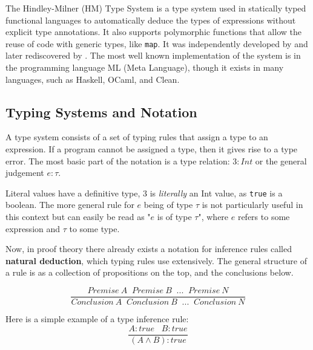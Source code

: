 \documentclass{l4proj}
\begin{document}
The Hindley-Milner (HM) Type System is a type system used in statically typed functional languages to automatically deduce the types of expressions without explicit type annotations.
It also supports polymorphic functions  that allow the reuse of code with generic types, like \texttt{map}.
It was independently developed by \citet{Hindley_1969} and later rediscovered by \citet{Milner_1978}.
The most well known implementation of the system is in the programming language ML (Meta Language), though it exists in many languages, such as Haskell, OCaml, and Clean.

\subsection{Typing Systems and Notation} \label{subsec:typing-systems-and-notation}

A type system consists of a set of typing rules that assign a type to an expression.
If a program cannot be assigned a type, then it gives rise to a type error.
%
The most basic part of the notation is a type relation: $3 : Int$ or the general judgement $e : \tau$.

Literal values have a definitive type, $3$ is \emph{literally} an Int value, as \texttt{true} is a boolean.
The more general rule for $e$ being of type $\tau$ is not particularly useful in this context but can easily be read as "$e$ is of type $\tau$", where $e$ refers to some expression and $\tau$ to some type.

Now, in proof theory there already exists a notation for inference rules called \textbf{natural deduction}\citep{Orman_1982}, which typing rules use extensively.
The general structure of a rule is as a collection of propositions on the top, and the conclusions below.

\begin{equation} \label{eq:inference-syntax-example}
\frac{Premise\: A \;\; Premise\: B \;\; ... \;\; Premise\: N}{Conclusion\: A \;\; Conclusion\: B \;\; ... \;\; Conclusion\: N}
\end{equation}

Here is a simple example of a type inference rule:
\begin{equation} \label{eq:inference-example}
\frac{A : true \;\;\; B : true}{(A \wedge B) : true}
\end{equation}
\end{document}
